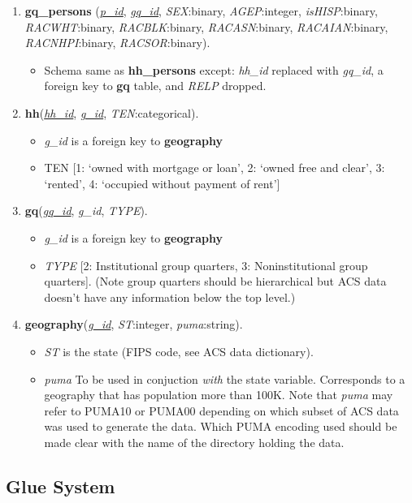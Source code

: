 \documentclass{amsart}
\begin{document}
{\begin{enumerate}
\item \textbf{gq\_persons}
(\underline{\textit{p\_id}}, \underline{\textit{gq\_id}}, \textit{SEX}:binary, \textit{AGEP}:integer, \textit{isHISP}:binary, \textit{RACWHT}:binary, \textit{RACBLK}:binary, \textit{RACASN}:binary, \textit{RACAIAN}:binary, \textit{RACNHPI}:binary, \textit{RACSOR}:binary).
\begin{itemize}
\item Schema same as \textbf{hh\_persons} except:  \textit{hh\_id} replaced with \textit{gq\_id}, a foreign key to \textbf{gq} table, and \textit{RELP} dropped.
\end{itemize}
\item \textbf{hh}(\underline{\textit{hh\_id}}, \underline{\textit{g\_id}}, \textit{TEN}:categorical). 
\begin{itemize}
\item \textit{g\_id} is a foreign key to \textbf{geography}
\item TEN [1: `owned with mortgage or loan', 2: `owned free and clear', 3: `rented', 4: `occupied without payment of rent']
\end{itemize}
\item \textbf{gq}(\underline{\textit{gq\_id}}, \textit{g\_id}, \textit{TYPE}). 
\begin{itemize}
\item \textit{g\_id} is a foreign key to \textbf{geography}
\item \textit{TYPE} [2: Institutional group quarters, 3: Noninstitutional group quarters]. (Note group quarters should be hierarchical but ACS data doesn't have any information below the top level.)
\end{itemize}
\item \textbf{geography}(\underline{\textit{g\_id}}, \textit{ST}:integer, \textit{puma}:string). 
\begin{itemize}
\item \textit{ST} is the state (FIPS code, see ACS data dictionary).
\item \textit{puma} To be used in conjuction \textit{with} the state variable. Corresponds to a geography that has population more than 100K. Note that \textit{puma} may refer to PUMA10 or PUMA00 depending on which subset of ACS data was used to generate the data.  Which PUMA encoding used should be made clear with the name of the directory holding the data.
\end{itemize}
\end{enumerate}


\subsection{Glue System}\label{sec:milestone:glue}

}
\end{document}
